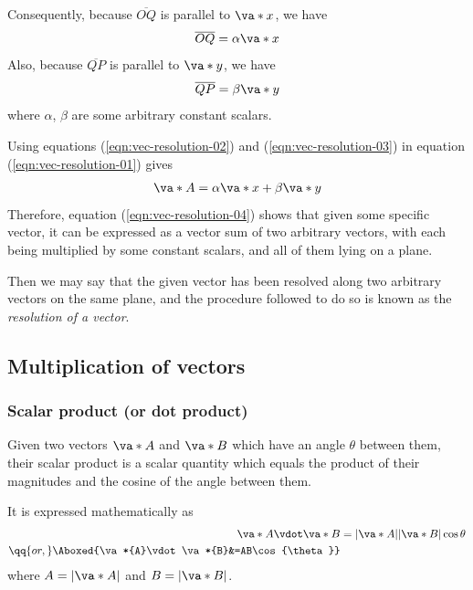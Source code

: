 			Consequently, because $\overline{OQ}$ is parallel to $\va*{x}$, we have
			\begin{align}
				\overline{OQ}=\alpha\va*{x} \label{eqn:vec-resolution-02}
			\end{align}
			Also, because $\overline{QP}$ is parallel to $\va*{y}$, we have
			\begin{align}
				\overline{QP}=\beta\va*{y} \label{eqn:vec-resolution-03}
			\end{align}
			where $\alpha$, $\beta$ are some arbitrary constant scalars.
			
			Using equations (\ref{eqn:vec-resolution-02}) and (\ref{eqn:vec-resolution-03}) in equation (\ref{eqn:vec-resolution-01}) gives
			\begin{align}
				\va*{A}=\alpha\va*{x}+\beta\va*{y} \label{eqn:vec-resolution-04}
			\end{align}
			Therefore, equation (\ref{eqn:vec-resolution-04}) shows that given some specific vector, it can be expressed as a vector sum of two arbitrary vectors, with each being multiplied by some constant scalars, and all of them lying on a plane.
			
			Then we may say that the given vector has been resolved along two arbitrary vectors on the same plane, and the procedure followed to do so is known as the \emph{resolution of a vector}.
			
	\subsection{Multiplication of vectors}
	
		\subsubsection{Scalar product (or dot product)}
			Given two vectors $\va*{A}$ and $\va*{B}$ which have an angle $\theta$ between them, their scalar product is a scalar quantity which equals the product of their magnitudes and the cosine of the angle between them.
			
			It is expressed mathematically as
			\begin{align*}
				\va*{A}\vdot\va*{B}&=|\va*{A}||\va*{B}|\cos{\theta} \\
				\qq{or,}\Aboxed{\va*{A}\vdot\va*{B}&=AB\cos{\theta}}
			\end{align*}
			where $A=|\va*{A}|$ and $B=|\va*{B}|$.
			
